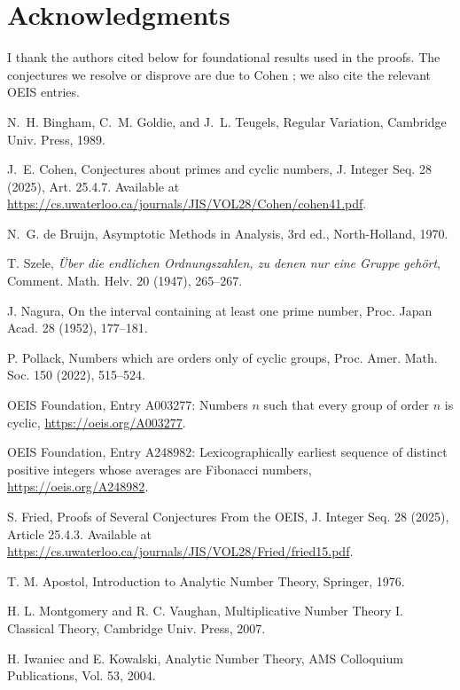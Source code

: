 \documentclass[12pt]{article}
\providecommand{\seqnum}[1]{#1}
\theoremstyle{remark}
\begin{document}
\section{Acknowledgments}
I thank the authors cited below for foundational results used in the proofs. The conjectures we resolve or disprove are due to Cohen \cite{Cohen2025}; we also cite the relevant OEIS entries.

\begin{thebibliography}{99}

N.~H. Bingham, C.~M. Goldie, and J.~L. Teugels, Regular Variation, Cambridge Univ. Press, 1989.

J.~E. Cohen, Conjectures about primes and cyclic numbers, J. Integer Seq. 28 (2025), Art. 25.4.7. Available at \url{https://cs.uwaterloo.ca/journals/JIS/VOL28/Cohen/cohen41.pdf}.

N.~G. de Bruijn, Asymptotic Methods in Analysis, 3rd ed., North-Holland, 1970.

T. Szele, \emph{\"Uber die endlichen Ordnungszahlen, zu denen nur eine Gruppe geh\"ort}, Comment. Math. Helv. 20 (1947), 265--267.

J. Nagura, On the interval containing at least one prime number, Proc. Japan Acad. 28 (1952), 177--181.

P. Pollack, Numbers which are orders only of cyclic groups, Proc. Amer. Math. Soc. 150 (2022), 515--524.

OEIS Foundation, Entry \seqnum{A003277}: Numbers $n$ such that every group of order $n$ is cyclic, \url{https://oeis.org/A003277}.

OEIS Foundation, Entry \seqnum{A248982}: Lexicographically earliest sequence of distinct positive integers whose averages are Fibonacci numbers, \url{https://oeis.org/A248982}.

S. Fried, Proofs of Several Conjectures From the OEIS, J. Integer Seq. 28 (2025), Article 25.4.3. Available at \url{https://cs.uwaterloo.ca/journals/JIS/VOL28/Fried/fried15.pdf}.

T. M. Apostol, Introduction to Analytic Number Theory, Springer, 1976.

H. L. Montgomery and R. C. Vaughan, Multiplicative Number Theory I. Classical Theory, Cambridge Univ. Press, 2007.

H. Iwaniec and E. Kowalski, Analytic Number Theory, AMS Colloquium Publications, Vol. 53, 2004.


\end{thebibliography}
\end{document}

